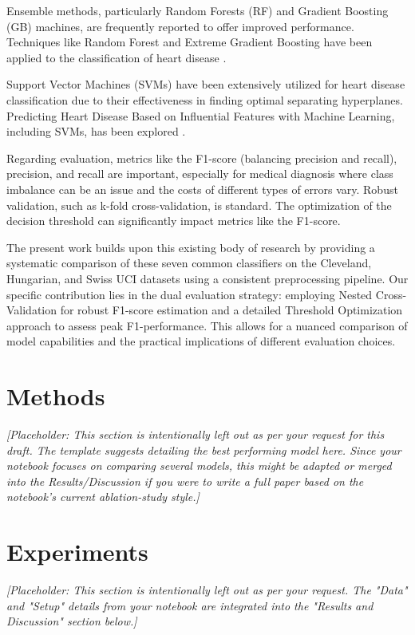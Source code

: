 \documentclass{article}
\begin{document}
Ensemble methods, particularly Random Forests (RF) and Gradient Boosting (GB) machines, are frequently reported to offer improved performance. Techniques like Random Forest and Extreme Gradient Boosting have been applied to the classification of heart disease \cite{Pratama2023}.

Support Vector Machines (SVMs) have been extensively utilized for heart disease classification due to their effectiveness in finding optimal separating hyperplanes. Predicting Heart Disease Based on Influential Features with Machine Learning, including SVMs, has been explored \cite{Dubey2021}.

Regarding evaluation, metrics like the F1-score (balancing precision and recall), precision, and recall are important, especially for medical diagnosis where class imbalance can be an issue and the costs of different types of errors vary. Robust validation, such as k-fold cross-validation, is standard. The optimization of the decision threshold can significantly impact metrics like the F1-score.

The present work builds upon this existing body of research by providing a systematic comparison of these seven common classifiers on the Cleveland, Hungarian, and Swiss UCI datasets using a consistent preprocessing pipeline. Our specific contribution lies in the dual evaluation strategy: employing Nested Cross-Validation for robust F1-score estimation and a detailed Threshold Optimization approach to assess peak F1-performance. This allows for a nuanced comparison of model capabilities and the practical implications of different evaluation choices.

\section{Methods}
\textit{[Placeholder: This section is intentionally left out as per your request for this draft. The template suggests detailing the best performing model here. Since your notebook focuses on comparing several models, this might be adapted or merged into the Results/Discussion if you were to write a full paper based on the notebook's current ablation-study style.]}

\section{Experiments}
\textit{[Placeholder: This section is intentionally left out as per your request. The "Data" and "Setup" details from your notebook are integrated into the "Results and Discussion" section below.]}
\end{document}
